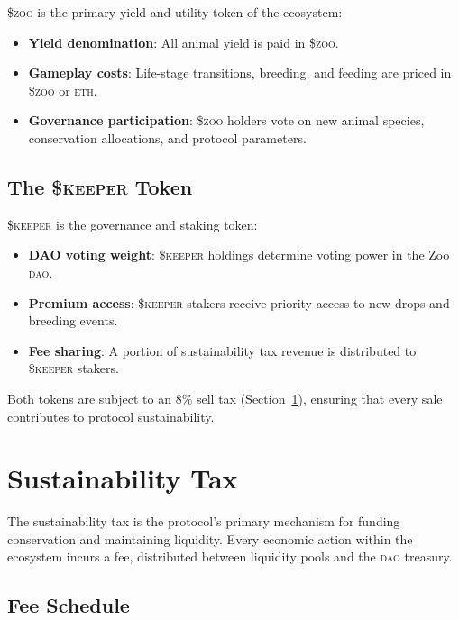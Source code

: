 \documentclass[11pt,letterpaper]{article}
\newcommand{\DAO}{\textsc{dao}}
\newcommand{\ZOO}{\$\textsc{zoo}}
\newcommand{\KEEPER}{\$\textsc{keeper}}
\newcommand{\ETH}{\textsc{eth}}
\begin{document}
\ZOO{} is the primary yield and utility token of the ecosystem:

\begin{itemize}
    \item \textbf{Yield denomination}: All animal yield is paid in \ZOO{}.
    \item \textbf{Gameplay costs}: Life-stage transitions, breeding, and feeding are priced in \ZOO{} or \ETH{}.
    \item \textbf{Governance participation}: \ZOO{} holders vote on new animal species, conservation allocations, and protocol parameters.
\end{itemize}

\subsection{The \KEEPER{} Token}

\KEEPER{} is the governance and staking token:

\begin{itemize}
    \item \textbf{DAO voting weight}: \KEEPER{} holdings determine voting power in the Zoo \DAO{}.
    \item \textbf{Premium access}: \KEEPER{} stakers receive priority access to new drops and breeding events.
    \item \textbf{Fee sharing}: A portion of sustainability tax revenue is distributed to \KEEPER{} stakers.
\end{itemize}

Both tokens are subject to an 8\% sell tax (Section~\ref{sec:sustainability-tax}), ensuring that every sale contributes to protocol sustainability.

\section{Sustainability Tax}
\label{sec:sustainability-tax}

The sustainability tax is the protocol's primary mechanism for funding conservation and maintaining liquidity.  Every economic action within the ecosystem incurs a fee, distributed between liquidity pools and the \DAO{} treasury.

\subsection{Fee Schedule}
\end{document}
